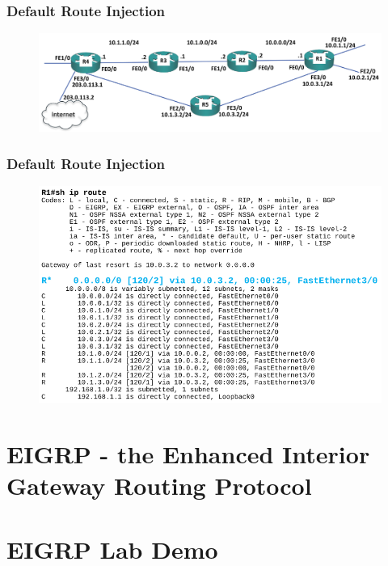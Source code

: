 \documentclass[pdflatex,compress,mathserif]{beamer}
\begin{document}
\begin{frame}
	\frametitle{Default Route Injection}
	\begin{figure}
		\centering
		\includegraphics[width=\linewidth]{img/img08}
	\end{figure}
\end{frame}

\begin{frame}
	\frametitle{Default Route Injection}
	\begin{figure}
		\centering
		\includegraphics[width=\linewidth]{img/img09}
	\end{figure}
\end{frame}

\section{EIGRP - the Enhanced Interior Gateway Routing Protocol}

\section{EIGRP Lab Demo}
\end{document}
